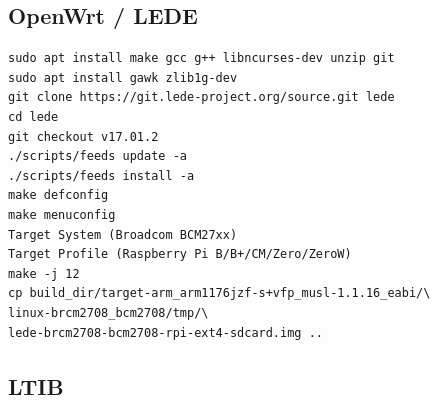 \documentclass[printmode]{mgr}
\begin{document}
\subsection{OpenWrt / LEDE}

\begin{lstlisting}
sudo apt install make gcc g++ libncurses-dev unzip git
sudo apt install gawk zlib1g-dev
git clone https://git.lede-project.org/source.git lede
cd lede
git checkout v17.01.2
./scripts/feeds update -a
./scripts/feeds install -a
make defconfig
make menuconfig
Target System (Broadcom BCM27xx)
Target Profile (Raspberry Pi B/B+/CM/Zero/ZeroW)
make -j 12
cp build_dir/target-arm_arm1176jzf-s+vfp_musl-1.1.16_eabi/\
linux-brcm2708_bcm2708/tmp/\
lede-brcm2708-bcm2708-rpi-ext4-sdcard.img ..
\end{lstlisting}



\subsection{LTIB}



%

\end{document}
